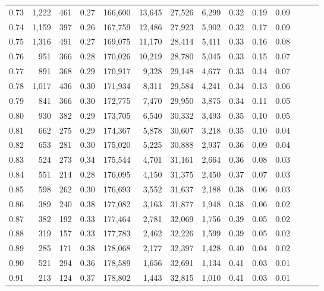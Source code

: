 \begin{tabular}{rrrrrrrrrrrrrr}
0.73 &  1,222 &  461 &  0.27 &  166,600 &   13,645 &  27,526 &   6,299 &  0.32 &  0.19 &      0.09 \\
0.74 &  1,159 &  397 &  0.26 &  167,759 &   12,486 &  27,923 &   5,902 &  0.32 &  0.17 &      0.09 \\
0.75 &  1,316 &  491 &  0.27 &  169,075 &   11,170 &  28,414 &   5,411 &  0.33 &  0.16 &      0.08 \\
0.76 &    951 &  366 &  0.28 &  170,026 &   10,219 &  28,780 &   5,045 &  0.33 &  0.15 &      0.07 \\
0.77 &    891 &  368 &  0.29 &  170,917 &    9,328 &  29,148 &   4,677 &  0.33 &  0.14 &      0.07 \\
0.78 &  1,017 &  436 &  0.30 &  171,934 &    8,311 &  29,584 &   4,241 &  0.34 &  0.13 &      0.06 \\
0.79 &    841 &  366 &  0.30 &  172,775 &    7,470 &  29,950 &   3,875 &  0.34 &  0.11 &      0.05 \\
0.80 &    930 &  382 &  0.29 &  173,705 &    6,540 &  30,332 &   3,493 &  0.35 &  0.10 &      0.05 \\
0.81 &    662 &  275 &  0.29 &  174,367 &    5,878 &  30,607 &   3,218 &  0.35 &  0.10 &      0.04 \\
0.82 &    653 &  281 &  0.30 &  175,020 &    5,225 &  30,888 &   2,937 &  0.36 &  0.09 &      0.04 \\
0.83 &    524 &  273 &  0.34 &  175,544 &    4,701 &  31,161 &   2,664 &  0.36 &  0.08 &      0.03 \\
0.84 &    551 &  214 &  0.28 &  176,095 &    4,150 &  31,375 &   2,450 &  0.37 &  0.07 &      0.03 \\
0.85 &    598 &  262 &  0.30 &  176,693 &    3,552 &  31,637 &   2,188 &  0.38 &  0.06 &      0.03 \\
0.86 &    389 &  240 &  0.38 &  177,082 &    3,163 &  31,877 &   1,948 &  0.38 &  0.06 &      0.02 \\
0.87 &    382 &  192 &  0.33 &  177,464 &    2,781 &  32,069 &   1,756 &  0.39 &  0.05 &      0.02 \\
0.88 &    319 &  157 &  0.33 &  177,783 &    2,462 &  32,226 &   1,599 &  0.39 &  0.05 &      0.02 \\
0.89 &    285 &  171 &  0.38 &  178,068 &    2,177 &  32,397 &   1,428 &  0.40 &  0.04 &      0.02 \\
0.90 &    521 &  294 &  0.36 &  178,589 &    1,656 &  32,691 &   1,134 &  0.41 &  0.03 &      0.01 \\
0.91 &    213 &  124 &  0.37 &  178,802 &    1,443 &  32,815 &   1,010 &  0.41 &  0.03 &      0.01 \\

\end{tabular}
